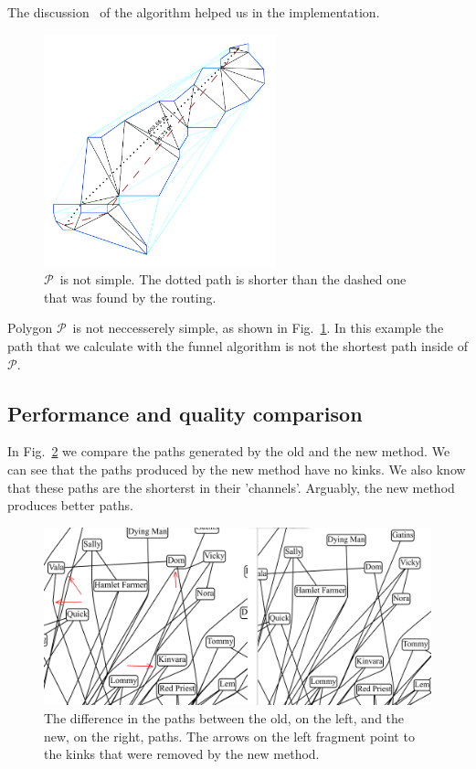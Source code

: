 \documentclass{gd-llncs}
\newcommand{\plg}{$\mathcal{P}$}
\begin{document}
{The discussion~\cite{pathOpt} of the algorithm helped us in the implementation.\\
\begin{figure}[]
  \centering
  \includegraphics*[width=0.6\textwidth]{sleeve_diagonals_not_optimal.pdf}
  \caption{\plg~is not simple. The dotted path is shorter than the dashed one that was found by the routing.}
  \label{fig:non_optimal_path}
\end{figure}
Polygon \plg~is not neccesserely simple, as shown in Fig.~\ref{fig:non_optimal_path}.
In this example the path that we calculate with the funnel algorithm is not the shortest path inside of \plg.
\subsection*{Performance and quality comparison}
In Fig.~\ref{fig:improved_routing} we compare the paths generated by the old and the new method. We can see that the paths produced by the new method have no kinks. We also know that these paths are  the shorterst in their 'channels'. Arguably, the new method produces better paths.
\begin{figure}[]
  \centering
  \includegraphics*[width=1\textwidth]{comparison.png}
  \caption{The difference in the paths between the old, on the left, and the new, on the right, paths. The arrows on the left fragment point to the kinks that were removed by the new method.}
  \label{fig:improved_routing}
\end{figure}


}
\end{document}
